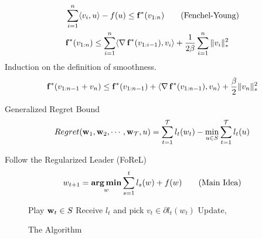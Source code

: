 \begin{frame}
    \begin{align*}
      & \sum_{i=1}^n \langle {v_i} , {u} \rangle - f(u) \le {\operatorname{\mathbf{f}}}^{*}(v_{1:n}) \tag{Fenchel-Young} \\
      & {\operatorname{\mathbf{f}}}^{*}(v_{1:n}) \le \sum_{i=1}^n \langle {\operatorname{\nabla}{\operatorname{\mathbf{f}}}^{*}(v_{1:i-1})} , {v_i} \rangle +\frac{1}{2\beta} \sum_{i=1}^n \|v_i\|_{*}^2
    \end{align*}
    Induction on the definition of smoothness.
    \begin{align*}
      {\operatorname{\mathbf{f}}}^{*}(v_{1:n-1}+v_n) \le {\operatorname{\mathbf{f}}}^{*}(v_{1:n-1}) + \langle {\operatorname{\nabla}{\operatorname{\mathbf{f}}}^{*}(v_{1:n-1})} , {v_n} \rangle +\frac{\beta}{2} \|v_n\|_{*}^2
    \end{align*}

\end{frame}


\begin{frame}{Generalized Regret Bound}
  \begin{align*}
    Regret(\operatorname{\mathbf{w}}_1,\operatorname{\mathbf{w}}_2,\cdots,\operatorname{\mathbf{w}}_{\operatorname{\mathcal{T}}},u) = \sum_{t=1}^{\operatorname{\mathcal{T}}} l_t(w_t) - \min_{u \in S} \sum_{t=1}^{\operatorname{\mathcal{T}}} l_t(u)
  \end{align*}
\end{frame}

\begin{frame}{Follow the Regularized Leader (FoReL)}
  \begin{align*}
    w_{t+1} = \operatorname*{\mathbf{arg\,min}}_w \sum_{s=1}^t l_s(w) + f(w) \tag{Main Idea}
  \end{align*}
  \begin{figure}
  \begin{algorithmic}[1]
    \State Play $\operatorname{\mathbf{w}}_t \in S$
    \State Receive $l_t$ and pick $v_t \in \partial l_t(w_t)$
    \State Update,
    \EndFor
  \end{algorithmic}
  \caption{The Algorithm}
  \end{figure}
\end{frame}

